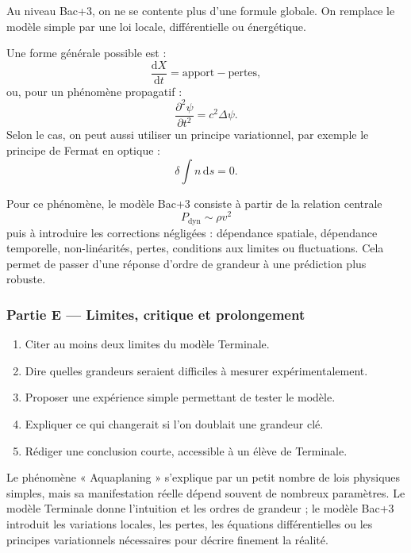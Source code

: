 \documentclass[11pt,a4paper]{article}
\begin{document}
\begin{approfondissementbox}
Au niveau Bac+3, on ne se contente plus d'une formule globale. On remplace le modèle simple par une loi locale, différentielle ou énergétique.

Une forme générale possible est :
\[
\frac{\mathrm d X}{\mathrm dt}=\text{apport}-\text{pertes},
\]
ou, pour un phénomène propagatif :
\[
\frac{\partial^2 \psi}{\partial t^2}=c^2\Delta\psi.
\]
Selon le cas, on peut aussi utiliser un principe variationnel, par exemple le principe de Fermat en optique :
\[
\delta \int n\,\mathrm ds=0.
\]

Pour ce phénomène, le modèle Bac+3 consiste à partir de la relation centrale
\[
P_{\mathrm{dyn}}\sim\rho v^2
\]
puis à introduire les corrections négligées : dépendance spatiale, dépendance temporelle, non-linéarités, pertes, conditions aux limites ou fluctuations. Cela permet de passer d'une réponse d'ordre de grandeur à une prédiction plus robuste.
\end{approfondissementbox}

\subsubsection*{Partie E — Limites, critique et prolongement}

\begin{enumerate}
  \item Citer au moins deux limites du modèle Terminale.
  \item Dire quelles grandeurs seraient difficiles à mesurer expérimentalement.
  \item Proposer une expérience simple permettant de tester le modèle.
  \item Expliquer ce qui changerait si l'on doublait une grandeur clé.
  \item Rédiger une conclusion courte, accessible à un élève de Terminale.
\end{enumerate}

\begin{corrigebox}
Le phénomène « Aquaplaning » s'explique par un petit nombre de lois physiques simples, mais sa manifestation réelle dépend souvent de nombreux paramètres. Le modèle Terminale donne l'intuition et les ordres de grandeur ; le modèle Bac+3 introduit les variations locales, les pertes, les équations différentielles ou les principes variationnels nécessaires pour décrire finement la réalité.
\end{corrigebox}
\end{document}
